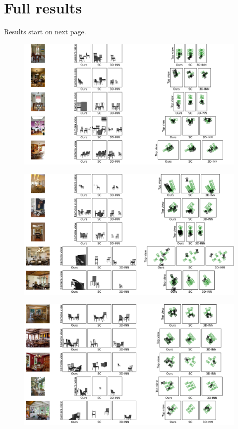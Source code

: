 
\appendix
\onecolumn
\section{Full results}
\label{app:results}
Results start on next page.
\begin{figure}
    \includegraphics[width=\textwidth]{figures/qualitative_results/full/qual_results_0.pdf}
\end{figure}
\begin{figure}
    \includegraphics[width=\textwidth]{figures/qualitative_results/full/qual_results_1.pdf}
\end{figure}
\begin{figure}
    \includegraphics[width=\textwidth]{figures/qualitative_results/full/qual_results_2.pdf}
\end{figure}
